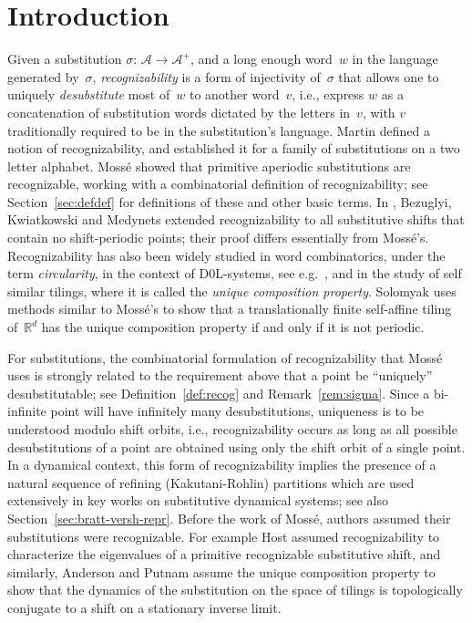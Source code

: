 \documentclass{amsart}
\theoremstyle{definition}
\theoremstyle{remark}
\numberwithin{equation}{section}
\begin{document}
\section{Introduction}
Given a substitution $\sigma:\, \mathcal{A} \to \mathcal{A}^+$, and a long enough word~$w$ in the language generated by~$\sigma$, \emph{recognizability} is a form of injectivity of~$\sigma$ that allows one to uniquely \emph{desubstitute} most of~$w$ to another word~$v$, i.e.,  express $w$ as a concatenation of substitution words dictated by the letters in~$v$, with $v$ traditionally required to be in the substitution's language. 
Martin \cite{Martin:71} defined a notion of recognizability, and established it for a family of substitutions on a two letter alphabet.
Moss\'{e} \cite{Mosse:92, Mosse:96} showed that primitive aperiodic substitutions are recognizable, working with a combinatorial definition of recognizability; see Section~\ref{sec:defdef}  for definitions of these and other basic terms.
In \cite{Bezugly:2009}, Bezuglyi, Kwiatkowski and Medynets extended recognizability to all substitutive shifts that contain no shift-periodic points; their proof  differs essentially from Moss\'{e}'s.
Recognizability has also been widely studied in word combinatorics, under the term \emph{circularity}, in the context of D$0$L-systems, see e.g.\ \cite{Cassaigne:94,KlouSta,MigSee:93},  and  in the study of self similar tilings, where it is called the \emph{unique composition property}. 
Solomyak \cite{Solomyak:98} uses methods similar to Moss\'{e}'s to show that a  translationally finite self-affine tiling of~$\mathbb{R}^d$ has the unique composition property if and only if it is not periodic.

For substitutions, the combinatorial formulation of recognizability that Moss\'{e} uses is strongly related to the requirement above that a point be ``uniquely'' desubstitutable; see Definition~\ref{def:recog} and Remark~\ref{rem:sigma}.
Since a bi-infinite point will have infinitely many desubstitutions, uniqueness is to be understood modulo shift orbits, i.e., recognizability occurs as long as all possible desubstitutions of a point are obtained using only the shift orbit of a single point. In a dynamical context, this form of recognizability implies the presence of a natural sequence of refining (Kakutani-Rohlin)  partitions which are used extensively in key works on substitutive dynamical systems; see also
Section~\ref{sec:bratt-versh-repr}.
Before the work of Moss\'{e}, authors assumed their substitutions were recognizable. For example Host \cite{Host:1986} assumed recognizability to characterize the eigenvalues of a primitive recognizable substitutive shift,   and similarly, Anderson and Putnam  \cite{AndersonPutnam:98} assume the unique composition property  to show that the dynamics of the substitution  on the space of tilings is topologically conjugate to a shift on a stationary inverse limit.
\end{document}
